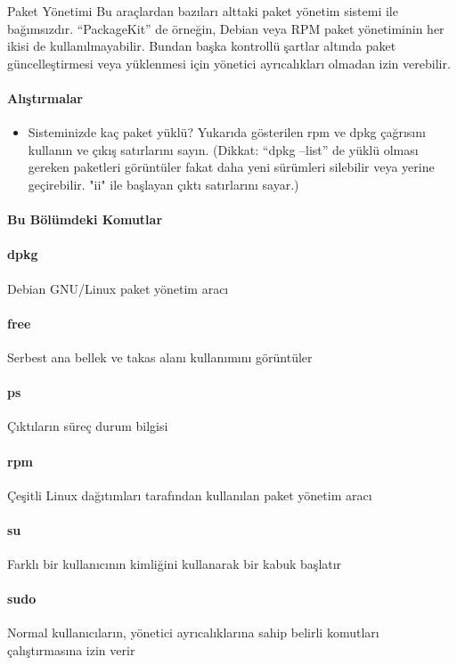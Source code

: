 \begin{section}{Paket Yönetimi}
Bu araçlardan bazıları alttaki paket yönetim sistemi ile bağımsızdır. “PackageKit” de örneğin, Debian veya RPM paket yönetiminin her ikisi de kullanılmayabilir. Bundan başka kontrollü şartlar altında paket güncelleştirmesi veya yüklenmesi için yönetici ayrıcalıkları olmadan izin verebilir.

\paragraph{Alıştırmalar}{
\begin{itemize}
\item Sisteminizde kaç paket yüklü? Yukarıda gösterilen rpm ve dpkg çağrısını kullanın ve çıkış satırlarını sayın. (Dikkat: “dpkg --list” de yüklü olması gereken paketleri görüntüler fakat daha yeni sürümleri silebilir veya yerine geçirebilir. "ii" ile başlayan çıktı satırlarını sayar.)
\end{itemize}}

\paragraph{Bu Bölümdeki Komutlar}{
\paragraph{dpkg}{Debian GNU/Linux paket yönetim aracı}
\paragraph{free}{Serbest ana bellek ve takas alanı kullanımını görüntüler}
\paragraph{ps}{Çıktıların süreç durum bilgisi}
\paragraph{rpm}{Çeşitli Linux dağıtımları tarafından kullanılan paket yönetim aracı}
\paragraph{su}{Farklı bir kullanıcının kimliğini kullanarak bir kabuk başlatır}
\paragraph{sudo}{Normal kullanıcıların, yönetici ayrıcalıklarına sahip belirli komutları çalıştırmasına izin verir}
}
\end{section}
